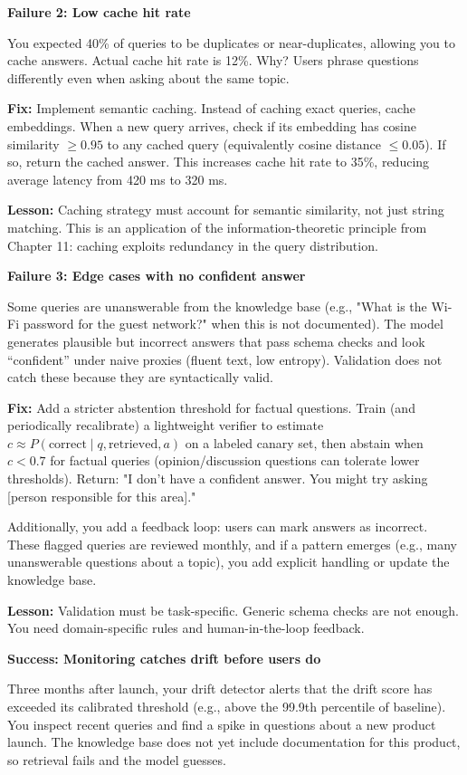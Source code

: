 \textbf{Failure 2: Low cache hit rate}

You expected 40\% of queries to be duplicates or near-duplicates, allowing you to cache answers. Actual cache hit rate is 12\%. Why? Users phrase questions differently even when asking about the same topic.

\textbf{Fix:} Implement semantic caching. Instead of caching exact queries, cache embeddings. When a new query arrives, check if its embedding has cosine similarity $\ge 0.95$ to any cached query (equivalently cosine distance $\le 0.05$). If so, return the cached answer. This increases cache hit rate to 35\%, reducing average latency from 420 ms to 320 ms.

\textbf{Lesson:} Caching strategy must account for semantic similarity, not just string matching. This is an application of the information-theoretic principle from Chapter 11: caching exploits redundancy in the query distribution.

\textbf{Failure 3: Edge cases with no confident answer}

Some queries are unanswerable from the knowledge base (e.g., "What is the Wi-Fi password for the guest network?" when this is not documented). The model generates plausible but incorrect answers that pass schema checks and look ``confident'' under naive proxies (fluent text, low entropy). Validation does not catch these because they are syntactically valid.

\textbf{Fix:} Add a stricter abstention threshold for factual questions. Train (and periodically recalibrate) a lightweight verifier to estimate $c \approx P(\text{correct}\mid q,\text{retrieved},a)$ on a labeled canary set, then abstain when $c < 0.7$ for factual queries (opinion/discussion questions can tolerate lower thresholds). Return: "I don't have a confident answer. You might try asking [person responsible for this area]."

Additionally, you add a feedback loop: users can mark answers as incorrect. These flagged queries are reviewed monthly, and if a pattern emerges (e.g., many unanswerable questions about a topic), you add explicit handling or update the knowledge base.

\textbf{Lesson:} Validation must be task-specific. Generic schema checks are not enough. You need domain-specific rules and human-in-the-loop feedback.

\textbf{Success: Monitoring catches drift before users do}

Three months after launch, your drift detector alerts that the drift score has exceeded its calibrated threshold (e.g., above the 99.9th percentile of baseline). You inspect recent queries and find a spike in questions about a new product launch. The knowledge base does not yet include documentation for this product, so retrieval fails and the model guesses.

